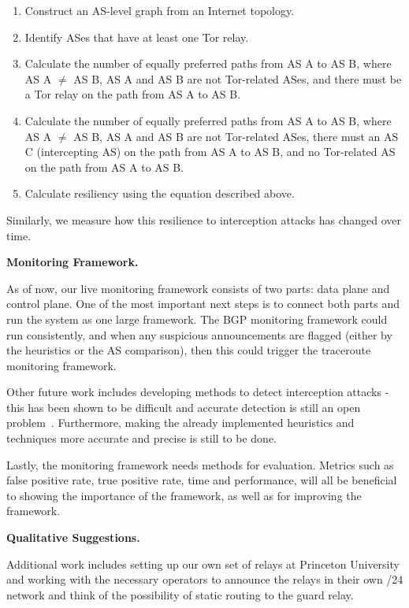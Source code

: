 \begin{enumerate}
\item Construct an AS-level graph from an Internet topology.
\item Identify ASes that have at least one Tor relay.
\item Calculate the number of equally preferred paths from AS A to AS B, where AS A $\neq$ AS B, AS A and AS B are not Tor-related ASes, and there must be a Tor relay on the path from AS A to AS B.
\item Calculate the number of equally preferred paths from AS A to AS B, where AS A $\neq$ AS B, AS A and AS B are not Tor-related ASes, there must an AS C (intercepting AS) on the path from AS A to AS B, and no Tor-related AS on the path from AS A to AS B.
\item Calculate resiliency using the equation described above.
\end{enumerate}

Similarly, we measure how this resilience to interception attacks has changed over time. 

{\bf Monitoring Framework.}  

As of now, our live monitoring framework consists of two parts: data plane and control plane.  One of the most important next steps is to connect both parts and run the system as one large framework.  The BGP monitoring framework could run consistently, and when any suspicious announcements are flagged (either by the heuristics or the AS comparison), then this could trigger the traceroute monitoring framework.  

Other future work includes developing methods to detect interception attacks - this has been shown to be difficult and accurate detection is still an open problem~\cite{ballani2007study}.  Furthermore, making the already implemented heuristics and techniques more accurate and precise is still to be done.  

Lastly, the monitoring framework needs methods for evaluation.  Metrics such as false positive rate, true positive rate, time and performance, will all be beneficial to showing the importance of the framework, as well as for improving the framework.  

{\bf Qualitative Suggestions.}

Additional work includes setting up our own set of relays at Princeton University and working with the necessary operators to announce the relays in their own /24 network and think of the possibility of static routing to the guard relay.
